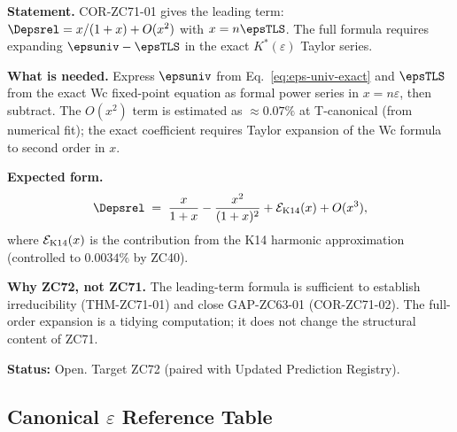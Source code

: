 \documentclass[12pt, a4paper]{article}
\begin{document}
\begin{openqbox}[title={GAP-ZC71-01: Exact $\Depsrel$ to All Orders in $x$
  (Open; ZC72 Candidate)}]

\textbf{Statement.}
COR-ZC71-01 gives the leading term:
$\Depsrel = x/(1+x) + O(x^2)$ with $x = n\epsTLS$.
The full formula requires expanding $\epsuniv - \epsTLS$
in the exact $K^*(\varepsilon)$ Taylor series.

\textbf{What is needed.}
Express $\epsuniv$ from Eq.~\eqref{eq:eps-univ-exact} and
$\epsTLS$ from the exact Wc fixed-point equation as formal
power series in $x = n\varepsilon$, then subtract.
The $O(x^2)$ term is estimated as $\approx 0.07\%$ at T-canonical
(from numerical fit); the exact coefficient requires Taylor
expansion of the Wc formula to second order in $x$.

\textbf{Expected form.}
\[
  \Depsrel
  \;=\;
  \frac{x}{1+x}
  - \frac{x^2}{(1+x)^2}
  + \mathcal{E}_{\rm K14}(x)
  + O(x^3),
\]
where $\mathcal{E}_{\rm K14}(x)$ is the contribution from the
K14 harmonic approximation (controlled to $0.0034\%$ by ZC40).

\textbf{Why ZC72, not ZC71.}
The leading-term formula is sufficient to establish irreducibility
(THM-ZC71-01) and close GAP-ZC63-01 (COR-ZC71-02).
The full-order expansion is a tidying computation; it does not
change the structural content of ZC71.

\textbf{Status:} Open. Target ZC72 (paired with Updated Prediction Registry).
\end{openqbox}

\subsection{Canonical $\varepsilon$ Reference Table}
\label{sec:eps-table}
\end{document}
